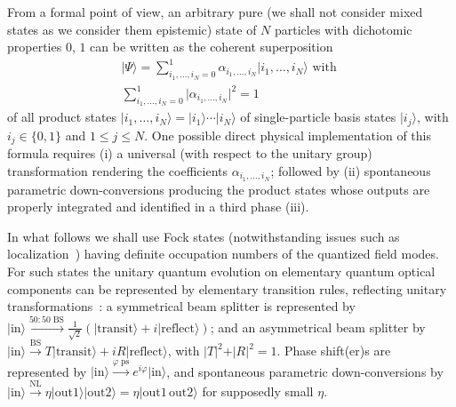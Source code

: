\documentclass{ws-book9x6}
\begin{document}
From a formal point of view, an arbitrary pure (we shall not consider mixed states as we consider them epistemic)
state of $N$ particles with dichotomic properties $0$, $1$
can be written as the coherent superposition
\begin{equation}
\begin{split}
 \vert   \Psi   \rangle
=
\sum_{i_1,\ldots , i_N=0}^{1}
\alpha_{i_1,\ldots , i_N}
\vert   i_1,\ldots , i_N    \rangle
\text{ with } \\
\sum_{i_1,\ldots , i_N=0}^{1}
\vert \alpha_{i_1,\ldots , i_N} \vert^2 =   1
\end{split}
\label{2017-etpi-e1}
\end{equation}
of all product states
$\vert   i_1,\ldots , i_N    \rangle
=
\vert    i_1 \rangle  \cdots  \vert   i_N    \rangle
$ of   single-particle basis states $\vert i_j \rangle $, with $i_j \in \{0,1\}$ and
 $1 \le j \le N$.
One possible direct physical implementation of this formula
requires
(i) a universal (with respect to the unitary group) transformation rendering the coefficients
$\alpha_{i_1,\ldots , i_N}$;
followed by
(ii)   spontaneous parametric down-conversions producing the product states
whose outputs are properly integrated and identified in a third phase (iii).

In what follows we shall use Fock states (notwithstanding issues such as localization~\cite[p.~931]{mandel-PhysRevA.28.929})
having definite occupation numbers of the quantized field modes.
For such states the unitary quantum evolution on elementary quantum optical components
can be represented by elementary transition rules, reflecting unitary transformations~\cite{zeilinger:882,green-horn-zei}:
a symmetrical beam splitter is represented by
$
\vert \text{in} \rangle
\xrightarrow{50:50\; \text{BS}}
\frac{1}{\sqrt{2}}\left(
\vert \text{transit} \rangle
+ i
\vert \text{reflect} \rangle
\right)
$; and an asymmetrical beam splitter by
$
\vert \text{in} \rangle
\xrightarrow{\text{BS}}
T
\vert \text{transit} \rangle
+ i
R
\vert \text{reflect} \rangle
$, with
$\vert T \vert^2
+
\vert R \vert^2 =1$.
Phase shift(er)s are represented by
$
\vert \text{in} \rangle
\xrightarrow{\varphi \;\text{ps}}
e^{i\varphi}
\vert \text{in} \rangle
$,
and  spontaneous parametric down-conversions by
$
\vert \text{in} \rangle
\xrightarrow{\text{NL}}
\eta \vert \text{out}1 \rangle \vert  \text{out}2 \rangle
=
\eta \vert \text{out}1\, \text{out}2 \rangle
$  for supposedly small $\eta$.
\end{document}
